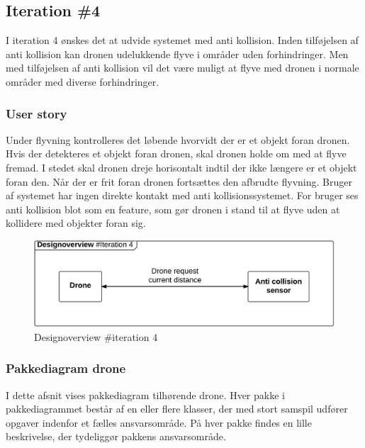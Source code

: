 \subsection{Iteration \#4}
I iteration 4 ønskes det at udvide systemet med anti kollision. Inden tilføjelsen af anti kollision kan dronen udelukkende flyve i områder uden forhindringer. Men med tilføjelsen af anti kollision vil det være muligt at flyve med dronen i normale områder med diverse forhindringer. 


\subsubsection*{User story}
Under flyvning kontrolleres det løbende hvorvidt der er et objekt foran dronen. Hvis der detekteres et objekt foran dronen, skal dronen holde om med at flyve fremad. I stedet skal dronen dreje horisontalt indtil der ikke længere er et objekt foran den. Når der er frit foran dronen fortsættes den afbrudte flyvning. 
Bruger af systemet har ingen direkte kontakt med anti kollisionssystemet. For bruger ses anti kollision blot som en feature, som gør dronen i stand til at flyve uden at kollidere med objekter foran sig.
 
\begin{figure}[H]
	\centering
	\includegraphics[width=1\textwidth]{Billeder/design_overview/design_overview_iteration4.png}
	\vspace{-.5cm}
	\caption{Designoverview \#iteration 4}
	\label{fig:design_overview_UC4}
\end{figure}

\newpage

\subsubsection*{Pakkediagram drone}
I dette afsnit vises pakkediagram tilhørende drone. Hver pakke i pakkediagrammet består af en eller flere klasser, der med stort samspil udfører opgaver indenfor et fælles ansvarsområde. På hver pakke findes en lille beskrivelse, der tydeliggør pakkens ansvarsområde. 


